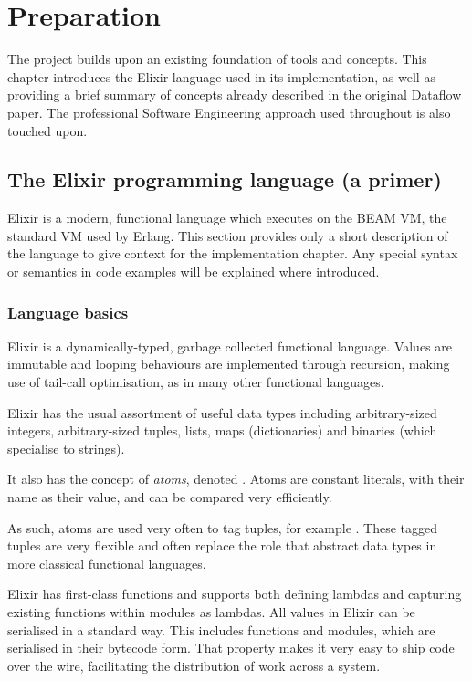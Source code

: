 \chapter{Preparation}\label{ch:prep}

The project builds upon an existing foundation of tools and concepts.
This chapter introduces the Elixir language used in its implementation, as well as providing a brief summary of concepts already described in the original Dataflow paper.
The professional Software Engineering approach used throughout is also touched upon.

\section{The Elixir programming language (a primer)}\label{sec:prep:elixir}

Elixir is a modern, functional language which executes on the BEAM VM, the standard VM used by Erlang.
This section provides only a short description of the language to give context for the implementation chapter.
Any special syntax or semantics in code examples will be explained where introduced.

\subsection{Language basics}\label{sec:prep:elixir:basics}

Elixir is a dynamically-typed, garbage collected functional language.
Values are immutable and looping behaviours are implemented through recursion, making use of tail-call optimisation, as in many other functional languages.

Elixir has the usual assortment of useful data types including arbitrary-sized integers, arbitrary-sized tuples, lists, maps (dictionaries) and binaries (which specialise to strings).

It also has the concept of \emph{atoms}, denoted .
Atoms are constant literals, with their name as their value, and can be compared very efficiently.

As such, atoms are used very often to tag tuples, for example .
These tagged tuples are very flexible and often replace the role that abstract data types in more classical functional languages.

Elixir has first-class functions and supports both defining lambdas and capturing existing functions within modules as lambdas.
All values in Elixir can be serialised in a standard way.
This includes functions and modules, which are serialised in their bytecode form.
That property makes it very easy to ship code over the wire, facilitating the distribution of work across a system.

